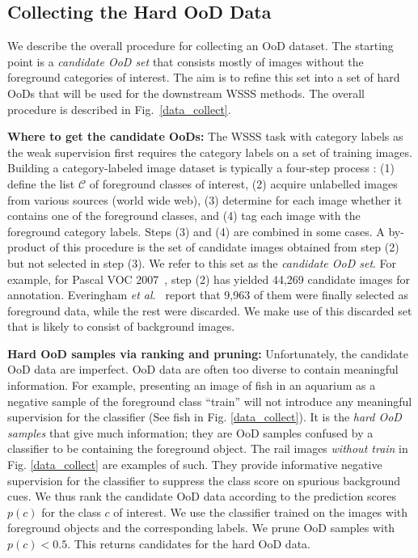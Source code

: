 \documentclass[10pt,twocolumn,letterpaper]{article}
\begin{document}
\subsection{Collecting the Hard OoD Data}\label{method_data}


We describe the overall procedure for collecting an OoD dataset. The starting point is a \textit{candidate OoD set} that consists mostly of images without the foreground categories of interest. 
The aim is to refine this set into a set of hard OoDs that will be used for the downstream WSSS methods. 
The overall procedure is described in Fig.~\ref{data_collect}.

\textbf{Where to get the candidate OoDs:}
The WSSS task with category labels as the weak supervision first requires the category labels on a set of training images. 
Building a category-labeled image dataset is typically a four-step process \cite{everingham2010pascal, kuznetsova2020open, lin2014microsoft, gupta2019lvis}: (1) define the list $\mathcal{C}$ of foreground classes of interest, (2) acquire unlabelled images from various sources (\eg world wide web), (3) determine for each image whether it contains one of the foreground classes, and (4) tag each image with the foreground category labels.
Steps (3) and (4) are combined in some cases.
A by-product of this procedure is the set of candidate images obtained from step (2) but not selected in step (3). We refer to this set as the \textit{candidate OoD set}. 
For example, for Pascal VOC 2007~\cite{everingham2010pascal}, step (2) has yielded 44,269 candidate images for annotation.
Everingham \textit{et al.}~\cite{everingham2010pascal} report that 9,963 of them were finally selected as foreground data, while the rest were discarded.
We make use of this discarded set that is likely to consist of background images.


\textbf{Hard OoD samples via ranking and pruning:}
Unfortunately, the candidate OoD data are imperfect. OoD data are often too diverse to contain meaningful information. For example, presenting an image of fish in an aquarium as a negative sample of the foreground class ``train'' will not introduce any meaningful supervision for the classifier (See fish in Fig. \ref{data_collect}). It is the \textit{hard OoD samples} that give much information; they are OoD samples confused by a classifier to be containing the foreground object. The rail images \textit{without train} in Fig. \ref{data_collect} are examples of such. They provide informative negative supervision for the classifier to suppress the class score on spurious background cues. 
We thus rank the candidate OoD data according to the prediction scores $p(c)$ for the class $c$ of interest. 
We use the classifier trained on the images with foreground objects and the corresponding labels.
We prune OoD samples with $p(c)<0.5$. This returns candidates for the hard OoD data.
\end{document}
